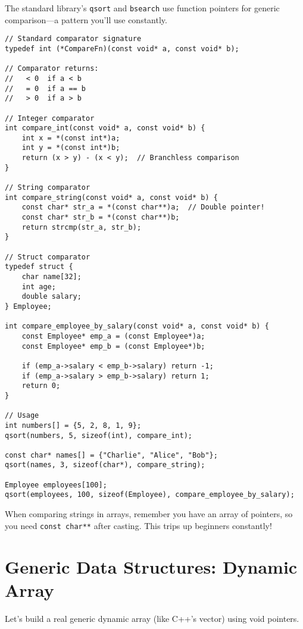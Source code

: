 The standard library's \texttt{qsort} and \texttt{bsearch} use function pointers for generic comparison---a pattern you'll use constantly.

\begin{lstlisting}
// Standard comparator signature
typedef int (*CompareFn)(const void* a, const void* b);

// Comparator returns:
//   < 0  if a < b
//   = 0  if a == b
//   > 0  if a > b

// Integer comparator
int compare_int(const void* a, const void* b) {
    int x = *(const int*)a;
    int y = *(const int*)b;
    return (x > y) - (x < y);  // Branchless comparison
}

// String comparator
int compare_string(const void* a, const void* b) {
    const char* str_a = *(const char**)a;  // Double pointer!
    const char* str_b = *(const char**)b;
    return strcmp(str_a, str_b);
}

// Struct comparator
typedef struct {
    char name[32];
    int age;
    double salary;
} Employee;

int compare_employee_by_salary(const void* a, const void* b) {
    const Employee* emp_a = (const Employee*)a;
    const Employee* emp_b = (const Employee*)b;

    if (emp_a->salary < emp_b->salary) return -1;
    if (emp_a->salary > emp_b->salary) return 1;
    return 0;
}

// Usage
int numbers[] = {5, 2, 8, 1, 9};
qsort(numbers, 5, sizeof(int), compare_int);

const char* names[] = {"Charlie", "Alice", "Bob"};
qsort(names, 3, sizeof(char*), compare_string);

Employee employees[100];
qsort(employees, 100, sizeof(Employee), compare_employee_by_salary);
\end{lstlisting}

\begin{tipbox}
When comparing strings in arrays, remember you have an array of pointers, so you need \texttt{const char**} after casting. This trips up beginners constantly!
\end{tipbox}

\section{Generic Data Structures: Dynamic Array}

Let's build a real generic dynamic array (like C++'s vector) using void pointers.


